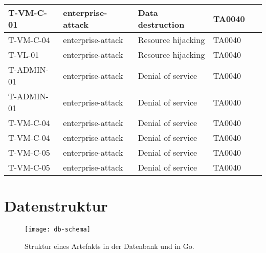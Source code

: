\begin{table}[!ht]
\begin{longtable}{|l|l|l|l|l|}
        T-VM-C-01 & enterprise-attack & Data destruction & TA0040 & ~ \\ \hline
        T-VM-C-04 & enterprise-attack & Resource hijacking & TA0040 & ~ \\ \hline
        T-VL-01 & enterprise-attack & Resource hijacking & TA0040 & ~ \\ \hline
        T-ADMIN-01 & enterprise-attack & Denial of service & TA0040 & ~ \\ \hline
        T-ADMIN-01 & enterprise-attack & Denial of service & TA0040 & ~ \\ \hline
        T-VM-C-04 & enterprise-attack & Denial of service & TA0040 & ~ \\ \hline
        T-VM-C-04 & enterprise-attack & Denial of service & TA0040 & ~ \\ \hline
        T-VM-C-05 & enterprise-attack & Denial of service & TA0040 & ~ \\ \hline
        T-VM-C-05 & enterprise-attack & Denial of service & TA0040 & ~ \\ \hline
    \end{longtable}
\end{table}

\chapter{Datenstruktur}
\label{app:db-schema}

\begin{figure}[H]
    \centering
    \texttt{[image: db-schema]}
    \caption{Struktur eines Artefakts in der Datenbank und in Go.}
\end{figure}



